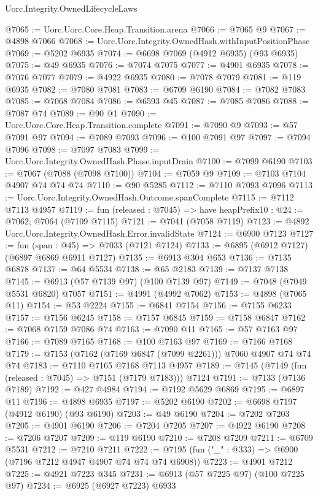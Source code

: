 \begin{lexlean}{Uorc.Integrity.OwnedLifecycleLaws}
\begin{coremodule}
@7065 := Uorc.Uorc.Core.Heap.Transition.arena
@7066 := @7065 @9
@7067 := @4898 @7066
@7068 := Uorc.Uorc.Integrity.OwnedHash.withInputPositionPhase
@7069 := @5202 @6935
@7074 := @6698 @7069 (@4912 @6935) (@93 @6935)
@7075 := @49 @6935
@7076 := @7074 @7075
@7077 := @4901 @6935
@7078 := @7076 @7077
@7079 := @4922 @6935
@7080 := @7078 @7079
@7081 := @119 @6935
@7082 := @7080 @7081
@7083 := @6709 @6190
@7084 := @7082 @7083
@7085 := @7068 @7084
@7086 := @6593 @45
@7087 := @7085 @7086
@7088 := @7087 @74
@7089 := @90 @1
@7090 := Uorc.Uorc.Core.Heap.Transition.complete
@7091 := @7090 @9
@7093 := @57 @7091 @97
@7094 := @7089 @7093
@7096 := @100 @7091 @97
@7097 := @7094 @7096
@7098 := @7097 @7083
@7099 := Uorc.Uorc.Integrity.OwnedHash.Phase.inputDrain
@7100 := @7099 @6190
@7103 := @7067 (@7088 (@7098 @7100))
@7104 := @7059 @9
@7109 := @7103 @7104 @4907 @74 @74 @74
@7110 := @90 @5285
@7112 := @7110 @7093 @7096
@7113 := Uorc.Uorc.Integrity.OwnedHash.Outcome.spanComplete
@7115 := @7112 @7113 @4957
@7119 := fun (released : @7045) => have heapPrefix10 : @24 := @7062; @7064 (@7109 @7115)
@7121 := @7041 (@7058 @7119)
@7123 := @4892 Uorc.Uorc.Integrity.OwnedHash.Error.invalidState
@7124 := @6900 @7123
@7127 := fun (span : @45) => @7033 (@7121 @7124)
@7133 := @6895 (@6912 @7127) (@6897 @6869 @6911 @7127)
@7135 := @6913 @304 @653
@7136 := @7135 @6878
@7137 := @64 @5534
@7138 := @65 @2183
@7139 := @7137 @7138
@7145 := @6913 (@57 @7139 @97) (@100 @7139 @97)
@7149 := @7048 (@7049 @5531 @6820) @7057
@7151 := @4991 (@4992 @7062)
@7153 := @4898 (@7065 @11)
@7154 := @53 @2224
@7155 := @6841 @7154
@7156 := @7155 @6233
@7157 := @7156 @6245
@7158 := @7157 @6845
@7159 := @7158 @6847
@7162 := @7068 @7159 @7086 @74
@7163 := @7090 @11
@7165 := @57 @7163 @97
@7166 := @7089 @7165
@7168 := @100 @7163 @97
@7169 := @7166 @7168
@7179 := @7153 (@7162 (@7169 @6847 (@7099 @2261))) @7060 @4907 @74 @74 @74
@7183 := @7110 @7165 @7168 @7113 @4957
@7189 := @7145 (@7149 (fun (released : @7045) => @7151 (@7179 @7183))) @7124
@7191 := @7133 (@7136 @7189)
@7192 := @427 @4984
@7194 := @7192 @5629 @6869
@7195 := @6897 @11
@7196 := @4898 @6935
@7197 := @5202 @6190
@7202 := @6698 @7197 (@4912 @6190) (@93 @6190)
@7203 := @49 @6190
@7204 := @7202 @7203
@7205 := @4901 @6190
@7206 := @7204 @7205
@7207 := @4922 @6190
@7208 := @7206 @7207
@7209 := @119 @6190
@7210 := @7208 @7209
@7211 := @6709 @5531
@7212 := @7210 @7211
@7222 := @7195 (fun ("_" : @333) => @6900 (@7196 @7212 @4947 @4907 @74 @74 @74 @6908))
@7223 := @4901 @7212
@7225 := @4921 @7223 @345
@7231 := @6913 (@57 @7225 @97) (@100 @7225 @97)
@7234 := @6925 (@6927 @7223) @6933

\end{coremodule}
\end{lexlean}
